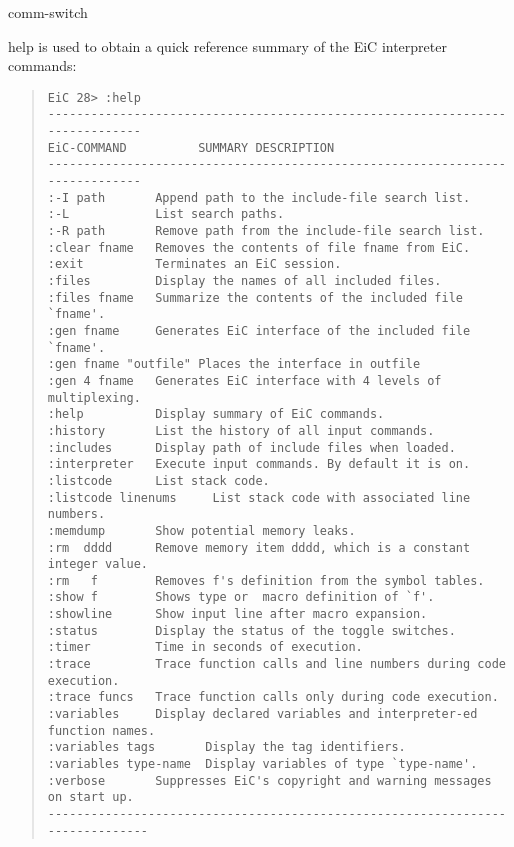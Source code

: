 \begin{Ventry}{comm-switch }
\item[help]
\label{item:help}
         is used to obtain a quick reference summary of the EiC
        interpreter commands:
\begin{quote}
\scriptsize
\begin{verbatim}
EiC 28> :help
-----------------------------------------------------------------------------
EiC-COMMAND          SUMMARY DESCRIPTION
-----------------------------------------------------------------------------
:-I path       Append path to the include-file search list.
:-L            List search paths.
:-R path       Remove path from the include-file search list.
:clear fname   Removes the contents of file fname from EiC.
:exit          Terminates an EiC session.
:files         Display the names of all included files.
:files fname   Summarize the contents of the included file `fname'.
:gen fname     Generates EiC interface of the included file `fname'.
:gen fname "outfile" Places the interface in outfile
:gen 4 fname   Generates EiC interface with 4 levels of multiplexing.
:help          Display summary of EiC commands.
:history       List the history of all input commands.
:includes      Display path of include files when loaded.
:interpreter   Execute input commands. By default it is on.
:listcode      List stack code.
:listcode linenums     List stack code with associated line numbers.
:memdump       Show potential memory leaks.
:rm  dddd      Remove memory item dddd, which is a constant integer value.
:rm   f        Removes f's definition from the symbol tables.
:show f        Shows type or  macro definition of `f'.
:showline      Show input line after macro expansion.
:status        Display the status of the toggle switches.
:timer         Time in seconds of execution.
:trace         Trace function calls and line numbers during code execution.
:trace funcs   Trace function calls only during code execution.
:variables     Display declared variables and interpreter-ed function names.
:variables tags       Display the tag identifiers.
:variables type-name  Display variables of type `type-name'.
:verbose       Suppresses EiC's copyright and warning messages on start up.
------------------------------------------------------------------------------
\end{verbatim}
\end{quote}
\end{Ventry}


